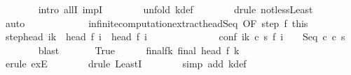 \begin{isabellebody}
\ \ \ \ \ \ \isamarkupfalse%
\ {\isacharparenleft}intro\ allI\ impI{\isacharparenright}\isanewline
\ \ \ \ \ \ \isamarkupfalse%
\ {\isacharparenleft}unfold\ k{\isacharunderscore}def{\isacharparenright}\isanewline
\ \ \ \ \ \ \isamarkupfalse%
\ {\isacharparenleft}drule\ not{\isacharunderscore}less{\isacharunderscore}Least{\isacharparenright}\isanewline
\ \ \ \ \ \ \isamarkupfalse%
\ auto\isanewline
\ \ \ \ \ \ \isamarkupfalse%
\isanewline
\ \ \ \ \isamarkupfalse%
\ infinite{\isacharunderscore}computation{\isacharunderscore}extract{\isacharunderscore}head{\isacharunderscore}Seq\ {\isacharbrackleft}OF\ step\ f{\isacharunderscore}{}\ this{\isacharbrackright}\isanewline
\ \ \ \ \isamarkupfalse%
\ step{\isacharunderscore}head{\isacharcolon}\ {\isachardoublequoteopen}{\isasymforall}i{\isacharless}k{\isachardot}\ {\isasymGamma}{\isasymturnstile}\ head\ {\isacharparenleft}f\ i{\isacharparenright}\ {\isasymrightarrow}\ head\ {\isacharparenleft}f\ {\isacharparenleft}i\ {\isacharplus}\ {}{\isacharparenright}{\isacharparenright}{\isachardoublequoteclose}\ \isanewline
\ \ \ \ \ \ \ \ \ \ \ conf{\isacharcolon}\ {\isachardoublequoteopen}{\isasymforall}i{\isacharless}k{\isachardot}\ {\isacharparenleft}{\isasymexists}c{\isacharprime}\ s{\isacharprime}{\isachardot}\ f\ {\isacharparenleft}i\ {\isacharplus}\ {}{\isacharparenright}\ {\isacharequal}\ {\isacharparenleft}Seq\ c{\isacharprime}\ c\ s{\isacharprime}{\isacharparenright}{\isacharparenright}{\isachardoublequoteclose}\isanewline
\ \ \ \ \ \ \isamarkupfalse%
\ blast\ \isanewline
\ \ \ \ \isamarkupfalse%
\ True\isanewline
\ \ \ \ \isamarkupfalse%
\ final{\isacharunderscore}f{\isacharunderscore}k{\isacharcolon}\ {\isachardoublequoteopen}final\ {\isacharparenleft}head\ {\isacharparenleft}f\ k{\isacharparenright}{\isacharparenright}{\isachardoublequoteclose}\isanewline
\ \ \ \ \ \ \isamarkupfalse%
\ {\isacharminus}\isanewline
\ \ \ \ \ \ \isamarkupfalse%
\ {\isacharparenleft}erule\ exE{\isacharparenright}\isanewline
\ \ \ \ \ \ \isamarkupfalse%
\ {\isacharparenleft}drule\ LeastI{\isacharparenright}\isanewline
\ \ \ \ \ \ \isamarkupfalse%
\ {\isacharparenleft}simp\ add{\isacharcolon}\ k{\isacharunderscore}def{\isacharparenright}\isanewline
\ \ \ \ \ \ \isamarkupfalse%
\isanewline

\end{isabellebody}
